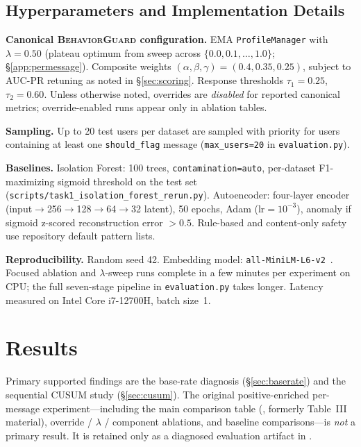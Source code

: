 \documentclass[conference]{IEEEtran}
\newcommand{\BG}{\textsc{BehaviorGuard}}
\begin{document}
\subsection{Hyperparameters and Implementation Details}

\textbf{Canonical \BG{} configuration.}
EMA \texttt{ProfileManager} with $\lambda{=}0.50$ (plateau optimum from sweep across
$\{0.0, 0.1, \ldots, 1.0\}$; \S\ref{app:permessage}).
Composite weights $(\alpha, \beta, \gamma) = (0.4, 0.35, 0.25)$, subject to AUC-PR
retuning as noted in \S\ref{sec:scoring}.
Response thresholds $\tau_1 = 0.25$, $\tau_2 = 0.60$.
Unless otherwise noted, overrides are \emph{disabled} for reported canonical metrics;
override-enabled runs appear only in ablation tables.

\textbf{Sampling.}
Up to 20 test users per dataset are sampled with priority for users containing at least
one \texttt{should\_flag} message (\texttt{max\_users=20} in \texttt{evaluation.py}).

\textbf{Baselines.}
Isolation Forest: 100 trees, \texttt{contamination=auto},
per-dataset F1-maximizing sigmoid threshold on the test set
(\texttt{scripts/task1\_isolation\_forest\_rerun.py}).
Autoencoder: four-layer encoder (input$\to$256$\to$128$\to$64$\to$32 latent), 50 epochs,
Adam ($\text{lr}=10^{-3}$), anomaly if sigmoid z-scored reconstruction error $> 0.5$.
Rule-based and content-only safety use repository default pattern lists.

\textbf{Reproducibility.}
Random seed 42.
Embedding model: \texttt{all-MiniLM-L6-v2}~\cite{hf2024sentence}.
Focused ablation and $\lambda$-sweep runs complete in a few minutes per experiment on
CPU; the full seven-stage pipeline in \texttt{evaluation.py} takes longer.
Latency measured on Intel Core i7-12700H, batch size~1.


\section{Results}
\label{sec:results}

Primary supported findings are the base-rate diagnosis (\S\ref{sec:baserate})
and the sequential CUSUM study (\S\ref{sec:cusum}).
The original positive-enriched per-message experiment---including the main
comparison table (, formerly Table~III material), override /
$\lambda$ / component ablations, and baseline comparisons---is \emph{not} a
primary result.
It is retained only as a diagnosed evaluation artifact in
.
\end{document}
